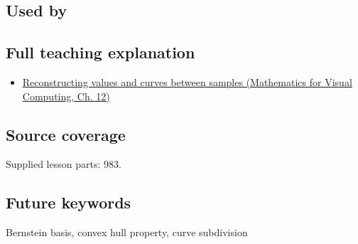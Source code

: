 \subsection{Used by}\label{appendix-ddbec701898c-used-by}

\hypertarget{appendix-ddbec701898c-used-by}{}

\subsection{Full teaching explanation}\label{appendix-ddbec701898c-full-teaching-explanation}

\hypertarget{appendix-ddbec701898c-full-teaching-explanation}{}

\begin{itemize}
\tightlist
\item
  \href{../02-Mathematics-for-Visual-Computing/main.pdf\#nameddest=02-foundations-ii-ch028-reconstructing-values-and-curves-between-samples}{Reconstructing values and curves between samples (Mathematics for Visual Computing, Ch. 12)}
\end{itemize}

\subsection{Source coverage}\label{appendix-ddbec701898c-source-coverage}

\hypertarget{appendix-ddbec701898c-source-coverage}{}

Supplied lesson parts: 983.

\subsection{Future keywords}\label{appendix-ddbec701898c-future-keywords}

\hypertarget{appendix-ddbec701898c-future-keywords}{}

Bernstein basis, convex hull property, curve subdivision
